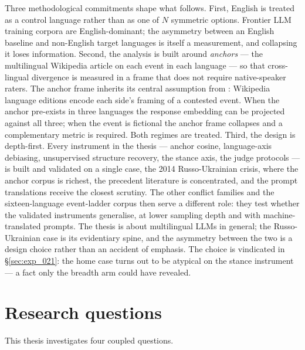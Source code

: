 Three methodological commitments shape what follows. First,
English is treated as a control language rather than as one of
$N$ symmetric options. Frontier LLM training corpora are
English-dominant; the asymmetry between an English baseline
and non-English target languages is itself a measurement, and
collapsing it loses information. Second, the analysis is built
around \emph{anchors} --- the multilingual Wikipedia article
on each event in each language --- so that cross-lingual
divergence is measured in a frame that does not require
native-speaker raters. The anchor frame inherits its
central assumption from \citet{oeberst2020wikipedia}:
Wikipedia language editions encode each side's framing of a
contested event. When the anchor pre-exists in three
languages the response embedding can be projected against all
three; when the event is fictional the anchor frame collapses
and a complementary metric is required. Both regimes are
treated. Third, the design is depth-first. Every instrument in
the thesis --- anchor cosine, language-axis debiasing,
unsupervised structure recovery, the stance axis, the judge
protocols --- is built and validated on a single case, the 2014
Russo-Ukrainian crisis, where the anchor corpus is richest, the
precedent literature is concentrated, and the prompt
translations receive the closest scrutiny. The other conflict
families and the sixteen-language event-ladder corpus then
serve a different role: they test whether the validated
instruments generalise, at lower sampling depth and with
machine-translated prompts. The thesis is about multilingual
LLMs in general; the Russo-Ukrainian case is its evidentiary
spine, and the asymmetry between the two is a design choice
rather than an accident of emphasis. The choice is vindicated
in \S\ref{sec:exp_021}: the home case turns out to be atypical
on the stance instrument --- a fact only the breadth arm could
have revealed.

\section{Research questions}\label{sec:rqs}

This thesis investigates four coupled questions.

